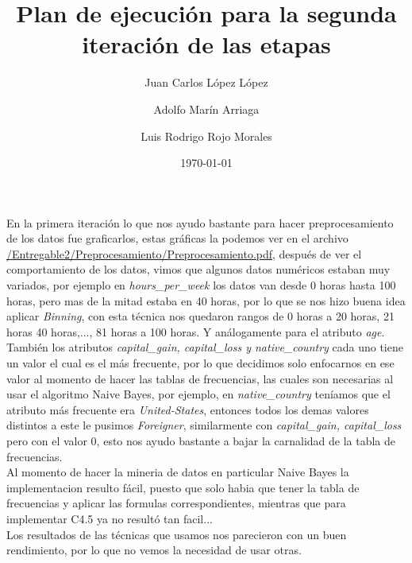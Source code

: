\documentclass{article}
\title{Plan	de	ejecución para	la	segunda	iteración	de	las	etapas}
\author{Juan Carlos López López \and Adolfo Marín Arriaga \and Luis Rodrigo Rojo Morales}
\date{\today\\}
\begin{document}
 \maketitle
 En la primera iteración lo que nos ayudo bastante para hacer preprocesamiento de los datos fue graficarlos, estas gráficas la podemos ver en el archivo \href{https://github.com/rodrigorojo/ProyectoFinalMineria/blob/master/Entregable2/Preprocesamiento/Preprocesamiento.pdf} {/Entregable2/Preprocesamiento/Preprocesamiento.pdf}, después de ver el comportamiento de los datos, vimos que algunos datos numéricos estaban muy variados, por ejemplo en {\it hours\_per\_week} los datos van desde 0 horas hasta 100 horas, pero mas de la mitad estaba en 40 horas, por lo que se nos hizo buena idea aplicar {\it Binning}, con esta técnica nos quedaron rangos de 0 horas a 20 horas, 21 horas 40 horas,..., 81 horas a 100 horas. Y análogamente para el atributo {\it age}.\\

 También los atributos {\it capital\_gain, capital\_loss y native\_country} cada uno tiene un valor el cual es el más frecuente, por lo que decidimos solo enfocarnos en ese valor al momento de hacer las tablas de frecuencias, las cuales son necesarias al usar el algoritmo Naive Bayes, por ejemplo, en {\it native\_country} teníamos que el atributo más frecuente era {\it United-States}, entonces todos los demas valores distintos a este le pusimos {\it Foreigner}, similarmente con {\it capital\_gain, capital\_loss} pero con el valor 0, esto nos ayudo bastante a bajar la carnalidad de la tabla de frecuencias.\\

 Al momento de hacer la mineria de datos en particular Naive Bayes la implementacion resulto fácil, puesto que solo habia que tener la tabla de frecuencias y aplicar las formulas correspondientes, mientras que para implementar C4.5 ya no resultó tan facil...\\

 Los resultados de las técnicas que usamos nos parecieron con un buen rendimiento, por lo que no vemos la necesidad de usar otras.
\end{document}
